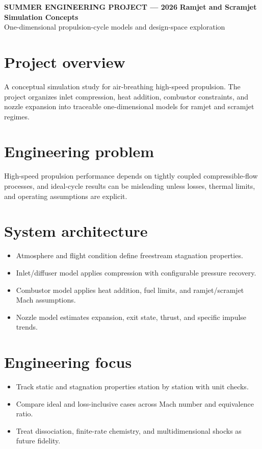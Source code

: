 \documentclass[10pt]{article}
\begin{document}
{\color{blue}\small\bfseries SUMMER ENGINEERING PROJECT --- 2026}
\vspace{0.4em}
{\color{navy}\LARGE\bfseries Ramjet and Scramjet Simulation Concepts}\\
{\color{muted}\large One-dimensional propulsion-cycle models and design-space exploration}

\section*{Project overview}
A conceptual simulation study for air-breathing high-speed propulsion. The project organizes inlet compression, heat addition, combustor constraints, and nozzle expansion into traceable one-dimensional models for ramjet and scramjet regimes.

\section*{Engineering problem}
High-speed propulsion performance depends on tightly coupled compressible-flow processes, and ideal-cycle results can be misleading unless losses, thermal limits, and operating assumptions are explicit.

\section*{System architecture}
\begin{itemize}
\item Atmosphere and flight condition define freestream stagnation properties.
\item Inlet/diffuser model applies compression with configurable pressure recovery.
\item Combustor model applies heat addition, fuel limits, and ramjet/scramjet Mach assumptions.
\item Nozzle model estimates expansion, exit state, thrust, and specific impulse trends.
\end{itemize}

\section*{Engineering focus}
\begin{itemize}
\item Track static and stagnation properties station by station with unit checks.
\item Compare ideal and loss-inclusive cases across Mach number and equivalence ratio.
\item Treat dissociation, finite-rate chemistry, and multidimensional shocks as future fidelity.
\end{itemize}
\end{document}
